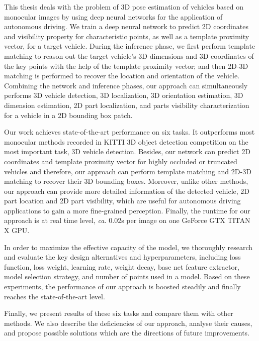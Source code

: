  This thesis deals with the problem of 3D pose estimation of vehicles based on monocular images by using deep neural networks for the application of autonomous driving. We train a deep neural network to predict 2D coordinates and visibility property for characteristic points, as well as a template proximity vector, for a target vehicle. During the inference phase, we first perform template matching to reason out the target vehicle's 3D dimensions and 3D coordinates of the key points with the help of the template proximity vector; and then 2D-3D matching is performed to recover the location and orientation of the vehicle. Combining the network and inference phases, our approach can simultaneously performs 3D vehicle detection, 3D localization, 3D orientation estimation, 3D dimension estimation, 2D part localization, and parts visibility characterization for a vehicle in a 2D bounding box patch. 
 
Our work achieves state-of-the-art performance on six tasks. It outperforms most monocular methods recorded in KITTI 3D object detection competition on the most important task, 3D vehicle detection. Besides, our network can predict 2D coordinates and template proximity vector for highly occluded or truncated vehicles and therefore, our approach can perform template matching and 2D-3D matching to recover their 3D bounding boxes. Moreover, unlike other methods, our approach can provide more detailed information of the detected vehicle, \eg 2D part location and 2D part visibility, which are useful for autonomous driving applications to gain a more  fine-grained perception. Finally, the runtime for our approach is at real time level, \textit{ca.} 0.02s per image on one GeForce GTX TITAN X GPU. 

In order to maximize the effective capacity of the model, we thoroughly research and evaluate the key design alternatives and hyperparameters, including loss function, loss weight, learning rate, weight decay, base net feature extractor, model selection strategy, and number of points used in a model. Based on these experiments, the performance of our approach is boosted steadily and finally reaches the state-of-the-art level.

Finally, we present results of these six tasks and compare them with other methods. We also describe the deficiencies of our approach, analyse their causes, and propose possible solutions which are the directions of future improvements. 
